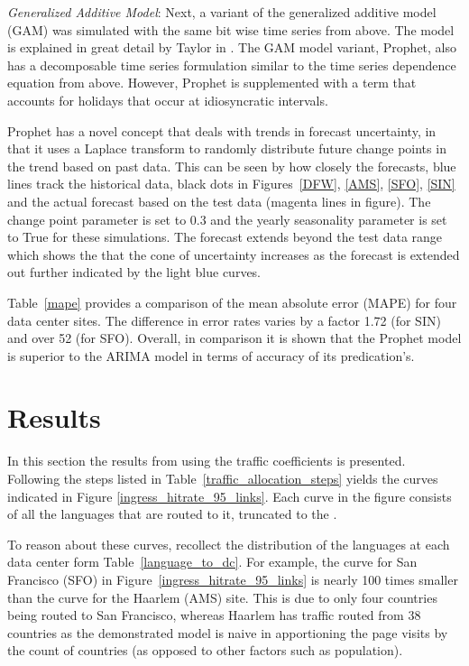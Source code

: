     
    
    \emph{Generalized Additive Model}: Next, a variant of the generalized additive model (GAM) was simulated with the same bit wise time series from above. The model is explained in great detail by Taylor in \cite{fbprophet}. The GAM model variant, Prophet, also has a decomposable time series formulation similar to the time series dependence equation from above. However, Prophet is supplemented with a term that accounts for holidays that occur at idiosyncratic  intervals. 
    
    Prophet has a novel concept that deals with trends in forecast uncertainty, in that it uses a Laplace transform to randomly distribute future change points in the trend based on past data. This can be seen by how closely the forecasts, blue lines track the historical data, black dots in Figures~\ref{DFW}, \ref{AMS}, \ref{SFO}, \ref{SIN} and the actual forecast based on the test data (magenta lines in figure). The change point parameter is set to 0.3 and the yearly seasonality parameter is set to True for these simulations. The forecast extends beyond the test data range which shows the that the cone of uncertainty increases as the forecast is extended out further indicated by the light blue curves. 
    
    
    
    Table~\ref{mape} provides a comparison of the mean absolute error (MAPE) for four data center sites. The difference in error rates varies by a factor 1.72 (for SIN) and over 52 (for SFO). Overall, in comparison it is shown that the Prophet model is superior to the ARIMA model in terms of accuracy of its predication's. 
    
    
\section {Results}

    In this section the results from using the traffic coefficients is presented. Following the steps listed in Table~\ref{traffic_allocation_steps} yields the curves indicated in Figure \ref{ingress_hitrate_95_links}. Each curve in the figure consists of all the languages that are routed to it, truncated to the . 
    
    To reason about these curves, recollect the distribution of the languages at each data center form Table~\ref{language_to_dc}. For example, the curve for San Francisco (SFO) in Figure~\ref{ingress_hitrate_95_links} is nearly 100 times smaller than the curve for the Haarlem (AMS) site. This is due to only four countries being routed to San Francisco, whereas Haarlem has traffic routed from 38 countries as the demonstrated model is naive in apportioning the page visits by the count of countries (as opposed to other factors such as population).  
    
